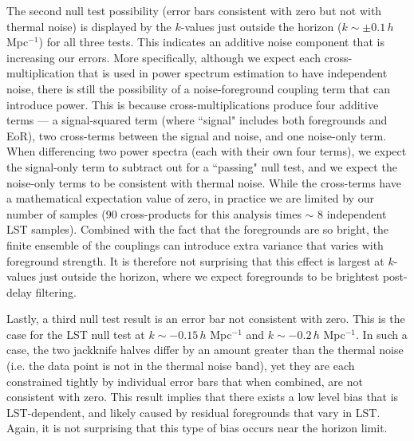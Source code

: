 \documentclass[preprint2,numberedappendix,tighten]{aastex6}  %
\begin{document}
The second null test possibility (error bars consistent with zero but not with thermal noise) is displayed by the $k$-values just outside the horizon ($k\sim\pm 0.1$\,$h$ Mpc$^{-1}$) for all three tests. This indicates an additive noise component that is increasing our errors. More specifically, although we expect each cross-multiplication that is used in power spectrum estimation to have independent noise, there is still the possibility of a noise-foreground coupling term that can introduce power. This is because cross-multiplications produce four additive terms --- a signal-squared term (where ``signal" includes both foregrounds and EoR), two cross-terms between the signal and noise, and one noise-only term. When differencing two power spectra (each with their own four terms), we expect the signal-only term to subtract out for a ``passing" null test, and we expect the noise-only terms to be consistent with thermal noise. While the cross-terms have a mathematical expectation value of zero, in practice we are limited by our number of samples ($90$ cross-products for this analysis times $\sim$ $8$ independent LST samples). Combined with the fact that the foregrounds are so bright, the finite ensemble of the couplings can introduce extra variance that varies with foreground strength. It is therefore not surprising that this effect is largest at $k$-values just outside the horizon, where we expect foregrounds to be brightest post-delay filtering.

Lastly, a third null test result is an error bar not consistent with zero. This is the case for the LST null test at $k\sim-0.15$\,$h$ Mpc$^{-1}$ and $k\sim-0.2$\,$h$ Mpc$^{-1}$. In such a case, the two jackknife halves differ by an amount greater than the thermal noise (i.e. the data point is not in the thermal noise band), yet they are each constrained tightly by individual error bars that when combined, are not consistent with zero. This result implies that there exists a low level bias that is LST-dependent, and likely caused by residual foregrounds that vary in LST. Again, it is not surprising that this type of bias occurs near the horizon limit.


\end{document}
